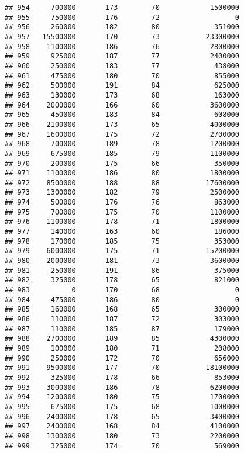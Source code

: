 \documentclass[
]{article}
\begin{document}
\begin{verbatim}
## 954     700000       173        70            1500000
## 955     750000       176        72                  0
## 956     260000       182        80             351000
## 957   15500000       170        73           23300000
## 958    1100000       186        76            2800000
## 959     925000       187        77            2400000
## 960     250000       183        77             438000
## 961     475000       180        70             855000
## 962     500000       191        84             625000
## 963     130000       173        68             163000
## 964    2000000       166        60            3600000
## 965     450000       183        84             608000
## 966    2100000       173        65            4000000
## 967    1600000       175        72            2700000
## 968     700000       189        78            1200000
## 969     675000       185        79            1100000
## 970     200000       175        66             350000
## 971    1100000       186        80            1800000
## 972    8500000       188        88           17600000
## 973    1300000       182        79            2500000
## 974     500000       176        76             863000
## 975     700000       175        70            1100000
## 976    1100000       178        71            1800000
## 977     140000       163        60             186000
## 978     170000       185        75             353000
## 979    6000000       175        71           15200000
## 980    2000000       181        73            3600000
## 981     250000       191        86             375000
## 982     325000       178        65             821000
## 983          0       170        68                  0
## 984     475000       186        80                  0
## 985     160000       168        65             300000
## 986     110000       187        72             303000
## 987     110000       185        87             179000
## 988    2700000       189        85            4300000
## 989     100000       180        71             208000
## 990     250000       172        70             656000
## 991    9500000       177        70           18100000
## 992     325000       178        66             853000
## 993    3000000       186        78            6200000
## 994    1200000       180        75            1700000
## 995     675000       175        68            1000000
## 996    2400000       178        65            3400000
## 997    2400000       168        84            4100000
## 998    1300000       180        73            2200000
## 999     325000       174        70             569000

\end{verbatim}
\end{document}
